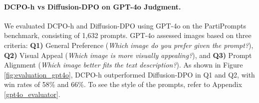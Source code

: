 \paragraph{DCPO-h vs Diffusion-DPO on GPT-4o Judgment.} We evaluated DCPO-h and Diffusion-DPO using GPT-4o on the PartiPrompts benchmark, consisting of 1,632 prompts. GPT-4o assessed images based on three criteria: \textbf{Q1)} General Preference (\textit{Which image do you prefer given the prompt?}), \textbf{Q2)} Visual Appeal (\textit{Which image is more visually appealing?}), and \textbf{Q3)} Prompt Alignment (\textit{Which image better fits the text description?}). As shown in Figure \ref{fig:evaluation_gpt4o}, DCPO-h outperformed Diffusion-DPO in Q1 and Q2, with win rates of 58\% and 66\%. To see the style of the prompts, refer to Appendix \ref{gpt4o_evaluator}.